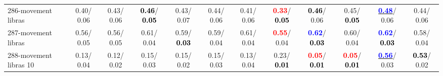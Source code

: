 \begin{table}[h]
\begin{center}
{\begin{tabular}{lc|c|c|c|c|c|c|c|c|c|c}
286-movement libras &   0.40/  0.06 &   0.43/  0.06 & \textcolor{black}{\textbf{  0.46}}/\textcolor{black}{\textbf{  0.05}} &   0.43/  0.07 &   0.44/  0.06 &   0.41/  0.06 & \textcolor{red}{\textbf{  0.33}}/\textcolor{black}{\textbf{  0.05}} & \textcolor{black}{\textbf{  0.46}}/  0.06 &   0.45/\textcolor{black}{\textbf{  0.05}} & \underline{\textcolor{blue}{\textbf{  0.48}}}/  0.06 &   0.44/  0.06 \\
287-movement libras &   0.56/  0.05 &   0.56/  0.05 &   0.61/  0.04 &   0.59/\textcolor{black}{\textbf{  0.03}} &   0.59/  0.04 &   0.61/  0.04 & \textcolor{red}{\textbf{  0.55}}/  0.04 & \textcolor{blue}{\textbf{  0.62}}/\textcolor{black}{\textbf{  0.03}} &   0.60/  0.04 & \textcolor{blue}{\textbf{  0.62}}/\textcolor{black}{\textbf{  0.03}} &   0.58/  0.04 \\
288-movement libras 10 &   0.13/  0.04 &   0.12/  0.02 &   0.15/  0.03 &   0.15/  0.02 &   0.15/  0.03 &   0.13/  0.04 &   0.23/\textcolor{black}{\textbf{  0.01}} & \textcolor{red}{\textbf{  0.05}}/\textcolor{black}{\textbf{  0.01}} & \textcolor{red}{\textbf{  0.05}}/\textcolor{black}{\textbf{  0.01}} & \underline{\textcolor{blue}{\textbf{  0.56}}}/  0.03 & \textcolor{black}{\textbf{  0.53}}/  0.02 \\\end{tabular}}\label{stratsALCKappa8AllReduxa}
\end{center}
\end{table}
